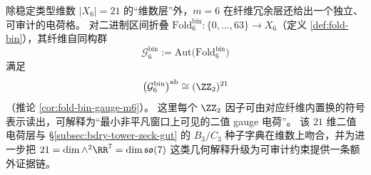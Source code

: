\begin{remark}[fold-gauge 的 \texorpdfstring{$(\ZZ_2)^{21}$}{(Z2)^21} 二值电荷层（\texorpdfstring{$m=6$}{m=6}，dyadic 读出）]\label{rem:fold-gauge-z2-21}
除稳定类型维数 \(|X_6|=21\) 的“维数层”外，\(m=6\) 在纤维冗余层还给出一个独立、可审计的电荷格。
对二进制区间折叠 \(\mathrm{Fold}^{\mathrm{bin}}_6:\{0,\dots,63\}\to X_6\)（定义 \ref{def:fold-bin}），其纤维自同构群
\[
\mathcal{G}^{\mathrm{bin}}_6:=\mathrm{Aut}\!\bigl(\mathrm{Fold}^{\mathrm{bin}}_6\bigr)
\]
满足
\[
\bigl(\mathcal{G}^{\mathrm{bin}}_6\bigr)^{\mathrm{ab}}\cong (\ZZ_2)^{21}
\]
（推论 \ref{cor:fold-bin-gauge-m6}）。
这里每个 \(\ZZ_2\) 因子可由对应纤维内置换的符号表示读出，可解释为“最小非平凡窗口上可见的二值 gauge 电荷”。
该 \(21\) 维二值电荷层与 \S\ref{subsec:bdry-tower-zeck-gut} 的 \(B_3/C_3\) 种子字典在维数上吻合，并为进一步把
\(
21=\dim\wedge^2\RR^7=\dim\mathfrak{so}(7)
\)
这类几何解释升级为可审计约束提供一条额外证据链。
\end{remark}
